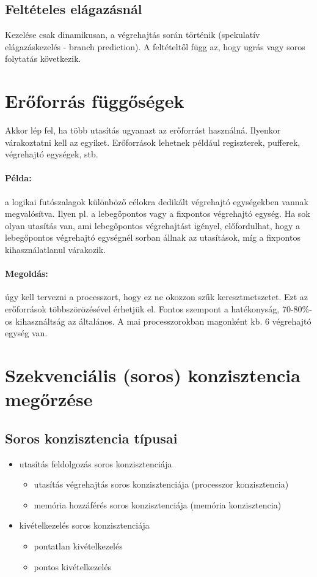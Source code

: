 \subsection{Feltételes elágazásnál}
Kezelése csak dinamikusan, a végrehajtás során történik (spekulatív elágazáskezelés - branch prediction).
A feltételtől függ az, hogy ugrás vagy soros folytatás következik.

\section{Erőforrás függőségek}
Akkor lép fel, ha több utasítás ugyanazt az erőforrást használná.
Ilyenkor várakoztatni kell az egyiket.
Erőforrások lehetnek például regiszterek, pufferek, végrehajtó egységek, stb.
\paragraph{Példa:} a logikai futószalagok különböző célokra dedikált végrehajtó egységekben vannak megvalósítva.
Ilyen pl. a lebegőpontos vagy a fixpontos végrehajtó egység.
Ha sok olyan utasítás van, ami lebegőpontos végrehajtást igényel, előfordulhat, hogy a lebegőpontos végrehajtó egységnél sorban állnak az utasítások, míg a fixpontos kihasználatlanul várakozik.
\paragraph{Megoldás:} úgy kell tervezni a processzort, hogy ez ne okozzon szűk keresztmetszetet. Ezt az erőforrások többszörözésével érhetjük el.
Fontos szempont a hatékonyság, 70-80\%-os kihasználtság az általános.
A mai processzorokban magonként kb. 6 végrehajtó egység van.

\section{Szekvenciális (soros) konzisztencia megőrzése}
\subsection{Soros konzisztencia típusai}
\begin{itemize}
    \item utasítás feldolgozás soros konzisztenciája
    \begin{itemize}
        \item utasítás végrehajtás soros konzisztenciája (processzor konzisztencia)
        \item memória hozzáférés soros konzisztenciája (memória konzisztencia)
    \end{itemize}
    \item kivételkezelés soros konzisztenciája
    \begin{itemize}
        \item pontatlan kivételkezelés
        \item pontos kivételkezelés
    \end{itemize}
\end{itemize}

